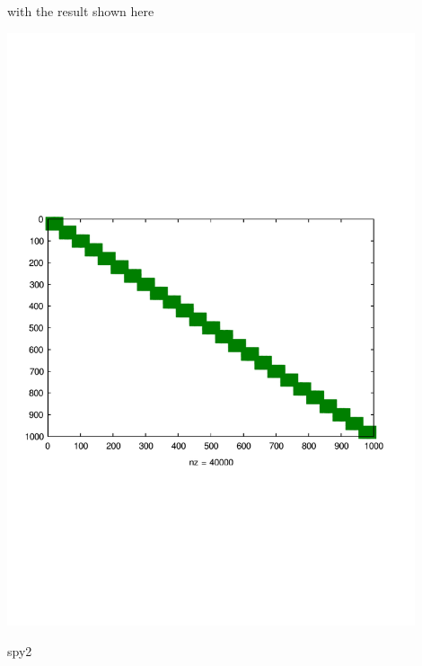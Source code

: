 with the result shown here  
\begin{DoxyImage}
\includegraphics[width=12cm]{spy2}
\caption{spy2}
\end{DoxyImage}
 
